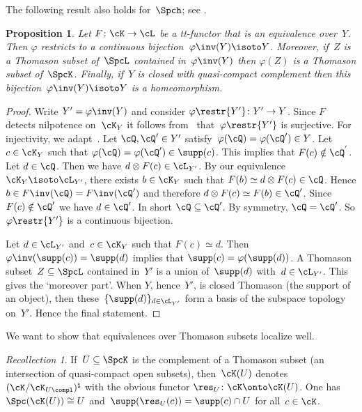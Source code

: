 \documentclass[11pt]{amsart}
\numberwithin{equation}{section} %
\theoremstyle{plain}
\newtheorem{prop}[equation]{Proposition}
\theoremstyle{definition}
\theoremstyle{remark}
\newtheorem{rec}[equation]{Recollection}
\begin{document}
The following result also holds for~$\Spch$; see .
%
\begin{prop}
\label{prop:Y-equivalence}%
Let $F\colon \cK\to \cL$ be a tt-functor that is an equivalence over~$Y$. Then $\varphi$ restricts to a continuous bijection~$\varphi\inv(Y)\isoto Y$. Moreover, if~$Z$ is a Thomason subset of~$\SpcL$ contained in~$\varphi\inv(Y)$ then $\varphi(Z)$ is a Thomason subset of~$\SpcK$. Finally, if~$Y$ is closed with quasi-compact complement then this bijection~$\varphi\inv(Y)\isoto Y$ is a homeomorphism.
\end{prop}
%
\begin{proof}
Write $Y'=\varphi\inv(Y)$ and consider $\varphi\restr{Y'}\colon Y'\to Y$. Since $F$ detects nilpotence on~$\cK_Y$ it follows from~\cite{Balmer18a} that~$\varphi\restr{Y'}$ is surjective. 
For injectivity, we adapt~\cite[Lemma~4.5]{BalmerSanders25}. Let $\cQ,\cQ'\in Y'$ satisfy~$\varphi(\cQ)=\varphi(\cQ')\in Y$. Let $c\in\cK_Y$ such that $\varphi(\cQ)=\varphi(\cQ')\in \supp(c)$. This implies that $F(c)\notin \cQ^{'}$. Let $d\in\cQ$. Then we have $d\otimes F(c)\in\cL_{Y'}$. By our equivalence~$\cK_Y\isoto \cL_{Y'}$, there exists $b\in\cK_Y$ such that $F(b)\simeq d\otimes F(c)\in\cQ$. Hence $b\in F\inv(\cQ)=F\inv(\cQ')$ and therefore $d\otimes F(c)\simeq F(b)\in\cQ'$. Since $F(c)\notin\cQ'$ we have $d\in\cQ'$. In short $\cQ\subseteq \cQ'$. By symmetry, $\cQ=\cQ'$. So $\varphi\restr{Y'}$ is a continuous bijection.

Let $d\in \cL_{Y'}$ and~$c\in\cK_{Y}$ such that $F(c)\simeq d$. Then~$\varphi\inv(\supp(c))=\supp(d)$ implies that $\supp(c)=\varphi(\supp(d))$. A Thomason subset~$Z\subseteq\SpcL$ contained in~$Y'$ is a union of~$\supp(d)$ with~$d\in\cL_{Y'}$. This gives the `moreover part'. When $Y$, hence~$Y'$, is closed Thomason (\ie the support of an object), then these~$\{\supp(d)\}_{d\in\cL_{Y'}}$ form a basis of the subspace topology on~$Y'$. Hence the final statement.
\end{proof}

We want to show that equivalences over Thomason subsets localize well.
%
\begin{rec}
\label{rec:K(U)}%
If~$U\subseteq \SpcK$ is the complement of a Thomason subset (\ie an intersection of quasi-compact open subsets), then~$\cK(U)$ denotes~$(\cK/\cK_{U\compl})^\natural$ with the obvious functor $\res_U\colon \cK\onto \cK(U)$. One has $\Spc(\cK(U))\cong U$ and~$\supp(\res_U(c))=\supp(c)\cap U$ for all~$c\in\cK$.
\end{rec}
\end{document}

